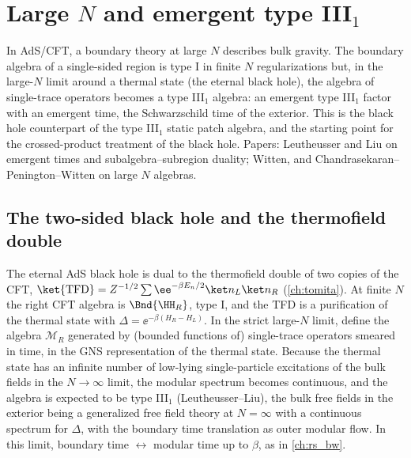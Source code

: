 \chapter{Large $N$ and emergent type III$_1$}\label{ch:large_N}
\skippable

\begin{physmotiv}
In AdS/CFT, a boundary theory at large $N$ describes bulk gravity. The boundary algebra of a single-sided region is type I in finite $N$ regularizations but, in the large-$N$ limit around a thermal state (the eternal black hole), the algebra of single-trace operators becomes a type III$_1$ algebra: an emergent type III$_1$ factor with an emergent time, the Schwarzschild time of the exterior. This is the black hole counterpart of the type III$_1$ static patch algebra, and the starting point for the crossed-product treatment of the black hole. Papers: Leutheusser and Liu on emergent times and subalgebra--subregion duality; Witten, and Chandrasekaran--Penington--Witten on large $N$ algebras.
\end{physmotiv}

\section{The two-sided black hole and the thermofield double}

The eternal AdS black hole is dual to the thermofield double of two copies of the CFT, $\ket{\rm TFD}=Z^{-1/2}\sum\ee^{-\beta E_n/2}\ket n_L\ket n_R$ (\cref{ch:tomita}). At finite $N$ the right CFT algebra is $\Bnd{\HH_R}$, type I, and the TFD is a purification of the thermal state with $\Delta=\ee^{-\beta(H_R-H_L)}$. In the strict large-$N$ limit, define the algebra $\mathcal M_R$ generated by (bounded functions of) single-trace operators smeared in time, in the GNS representation of the thermal state. Because the thermal state has an infinite number of low-lying single-particle excitations of the bulk fields in the $N\to\infty$ limit, the modular spectrum becomes continuous, and the algebra is expected to be type III$_1$ (Leutheusser--Liu), the bulk free fields in the exterior being a generalized free field theory at $N=\infty$ with a continuous spectrum for $\Delta$, with the boundary time translation as outer modular flow. In this limit, boundary time $\leftrightarrow$ modular time up to $\beta$, as in \cref{ch:rs_bw}.

